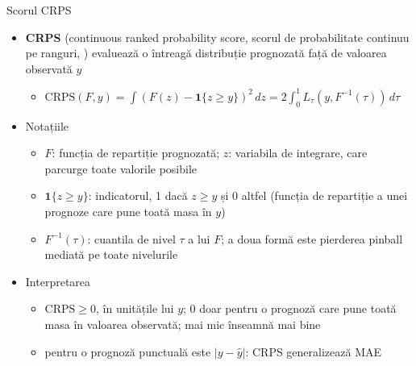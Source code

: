 \begin{frame}{Scorul CRPS}
\itemsize{\footnotesize}
\begin{itemize}
    \item \textbf{CRPS} (continuous ranked probability score, scorul de probabilitate continuu pe ranguri, ) evaluează o întreagă distribuție prognozată față de valoarea observată $y$
    \begin{itemize}
        \item $\text{CRPS}(F, y) = \int (F(z) - \mathbf{1}\{z \ge y\})^2\,dz = 2\int_0^1 L_\tau(y, F^{-1}(\tau))\,d\tau$
    \end{itemize}
    \item Notațiile
    \begin{itemize}
        \item $F$: funcția de repartiție prognozată; $z$: variabila de integrare, care parcurge toate valorile posibile
        \item $\mathbf{1}\{z \ge y\}$: indicatorul, 1 dacă $z \ge y$ și 0 altfel (funcția de repartiție a unei prognoze care pune toată masa în $y$)
        \item $F^{-1}(\tau)$: cuantila de nivel $\tau$ a lui $F$; a doua formă este pierderea pinball mediată pe toate nivelurile
    \end{itemize}
    \item Interpretarea
    \begin{itemize}
        \item $\text{CRPS} \ge 0$, în unitățile lui $y$; 0 doar pentru o prognoză care pune toată masa în valoarea observată; mai mic înseamnă mai bine
        \item pentru o prognoză punctuală este $|y - \hat y|$: CRPS generalizează MAE
    \end{itemize}
\end{itemize}
\end{frame}

